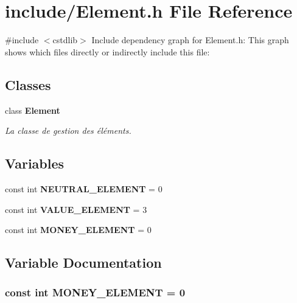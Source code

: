 \section{include/\-Element.h \-File \-Reference}
\label{_element_8h}
{\ttfamily \#include $<$cstdlib$>$}\*
\-Include dependency graph for \-Element.\-h\-:
\-This graph shows which files directly or indirectly include this file\-:
\subsection*{\-Classes}
\begin{DoxyCompactItemize}
\item 
class {\bf \-Element}
\begin{DoxyCompactList}\small\item\em \-La classe de gestion des éléments. \end{DoxyCompactList}\end{DoxyCompactItemize}
\subsection*{\-Variables}
\begin{DoxyCompactItemize}
\item 
const int {\bf \-N\-E\-U\-T\-R\-A\-L\-\_\-\-E\-L\-E\-M\-E\-N\-T} = 0
\item 
const int {\bf \-V\-A\-L\-U\-E\-\_\-\-E\-L\-E\-M\-E\-N\-T} = 3
\item 
const int {\bf \-M\-O\-N\-E\-Y\-\_\-\-E\-L\-E\-M\-E\-N\-T} = 0
\end{DoxyCompactItemize}


\subsection{\-Variable \-Documentation}
\subsubsection[{\-M\-O\-N\-E\-Y\-\_\-\-E\-L\-E\-M\-E\-N\-T}]{\setlength{\rightskip}{0pt plus 5cm}const int {\bf \-M\-O\-N\-E\-Y\-\_\-\-E\-L\-E\-M\-E\-N\-T} = 0}\label{_element_8h_a1e4d7940dd4fb43147b9adfacfb1a8cc}


